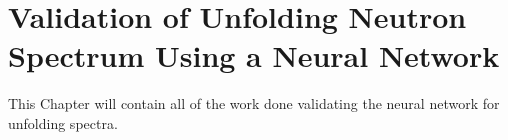 \chapter{Validation of Unfolding Neutron Spectrum Using a Neural Network}\label{chap_chap5}
This Chapter will contain all of the work done validating the neural network for unfolding spectra.